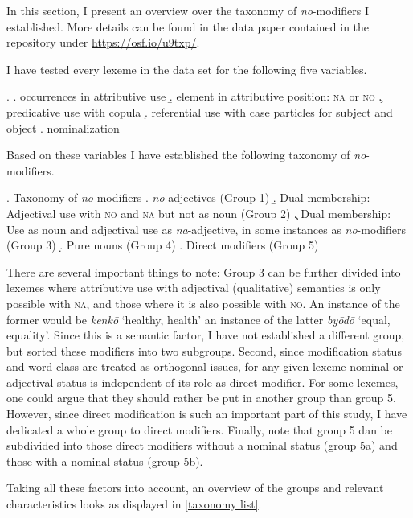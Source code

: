 In this section, I present an overview over the taxonomy of \textit{no}-modifiers I established. More details can be found in the data paper contained in the repository under \url{https://osf.io/u9txp/}.

I have tested every lexeme in the data set for the following five variables. 

\ex. \a. occurrences in attributive use
\b. element in attributive position: \textsc{na} or \textsc{no}
\c. predicative use with copula
\d. referential use with case particles for subject and object
\e. nominalization

Based on these variables I have established the following taxonomy of \textit{no}-modifiers.

\ex. Taxonomy of \textit{no}-modifiers
\a. \textit{no}-adjectives (Group 1)
\b. Dual membership: Adjectival use with \textsc{no} and \textsc{na} but not as noun (Group 2)
\c. Dual membership: Use as noun and adjectival use as \textit{na}-adjective, in some instances as \textit{no}-modifiers (Group 3)
\d. Pure nouns (Group 4)
\e. Direct modifiers (Group 5)

There are several important things to note: Group 3 can be further divided into lexemes where attributive use with adjectival (qualitative) semantics is only possible with \textsc{na}, and those where it is also possible with \textsc{no}. An instance of the former would be \textit{kenkō} `healthy, health’ an instance of the latter \textit{byōdō} `equal, equality’. Since this is a semantic factor, I have not established a different group, but sorted these modifiers into two subgroups. Second, since modification status and word class are treated as orthogonal issues, for any given lexeme nominal or adjectival status is independent of its role as direct modifier. For some lexemes, one could argue that they should rather be put in another group than group 5. However, since direct modification is such an important part of this study, I have dedicated a whole group to direct modifiers. Finally, note that group 5 dan be subdivided into those direct modifiers without a nominal status (group 5a) and those with a nominal status (group 5b). 

Taking all these factors into account, an overview of the groups and relevant characteristics looks as displayed in \ref{taxonomy list}.

